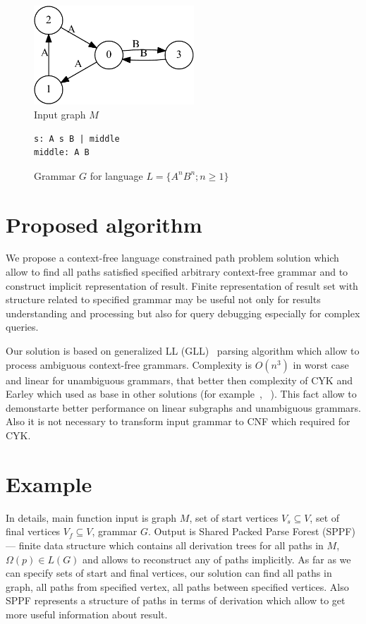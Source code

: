 \documentclass{sig-alternate} %
\begin{document}
\begin{figure}[h]
    \begin{center}
        \includegraphics[width=6cm]{dot/input.pdf}
        \caption{Input graph $M$}
        \label{input}        
    \end{center}
\end{figure}

\begin{figure}[h]
   \begin{center}
\begin{verbatim}
s: A s B | middle
middle: A B
\end{verbatim}
   \caption{Grammar $G$ for language $L=\{A^n B^n; n \geq 1\}$}
   \label{grammarG}        
   \end{center}
\end{figure}

\section{Proposed algorithm}
We propose a context-free language constrained path problem solution which allow to find all paths satisfied specified arbitrary context-free grammar and to construct implicit representation of result. 
Finite representation of result set with structure related to specified grammar may be useful not only for results understanding and processing but also for query debugging especially for complex queries. 

Our solution is based on generalized LL (GLL)~\cite{scott2010gll, FastPracticalGLL} parsing algorithm which allow to process ambiguous context-free grammars.
Complexity is $O(n^3)$ in worst case and linear for unambiguous grammars, that better then complexity of CYK and Earley which used as base in other solutions (for example~\cite{ConjCFPathQuery}, ~\cite{GraphQueryWithEarley}).
This fact allow to demonstarte better performance on linear subgraphs and unambiguous grammars.
Also it is not necessary to transform input grammar to CNF which required for CYK.

\section{Example}
In details, main function input is graph $M$, set of start vertices $V_s\subseteq V$, set of final vertices $V_f\subseteq V$, grammar $G$.
Output is Shared Packed Parse Forest (SPPF)~\cite{SPPF} --- finite data structure which contains all derivation trees for all paths in $M$, $\Omega(p) \in L(G)$ and allows to reconstruct any of paths implicitly.
As far as we can specify sets of start and final vertices, our solution can find all paths in graph, all paths from specified vertex, all paths between specified vertices. 
Also SPPF represents a structure of paths in terms of derivation which allow to get more useful information about result.
\end{document}
